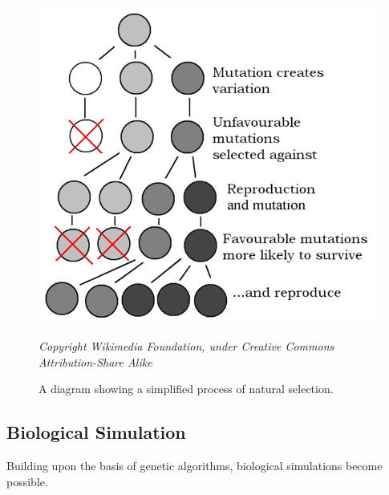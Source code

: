 \begin{figure}[!th]
	\centering
	\includegraphics[scale=0.35]{images/evo}
	\caption{\label{fig:evo}A diagram showing a simplified process of natural selection.}
	\textit{Copyright Wikimedia Foundation, under Creative Commons Attribution-Share Alike~\cite{mutationandselection}}
\end{figure}

\subsection{Biological Simulation}
Building upon the basis of genetic algorithms, biological simulations become possible.

